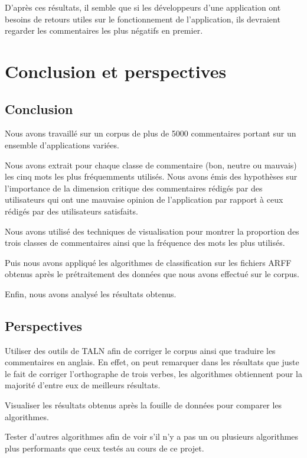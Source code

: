 \documentclass[a4paper, 11pt]{article}
\begin{document}
D'après ces résultats, il semble que si les développeurs d'une application ont besoins de retours utiles sur le fonctionnement de l'application, ils devraient regarder les commentaires les plus négatifs en premier.

\section{Conclusion et perspectives}
\subsection{Conclusion}
Nous avons travaillé sur un corpus de plus de 5000 commentaires portant sur un ensemble d'applications variées. 

Nous avons extrait pour chaque classe de commentaire (bon, neutre ou mauvais) les cinq mots les plus fréquemments utilisés. Nous avons émis des hypothèses sur l'importance de la dimension critique des commentaires rédigés par des utilisateurs qui ont une mauvaise opinion de l'application par rapport à ceux rédigés par des utilisateurs satisfaits.

Nous avons utilisé des techniques de visualisation pour montrer la proportion des trois classes de commentaires ainsi que la fréquence des mots les plus utilisés.

Puis nous avons appliqué les algorithmes de classification sur les fichiers ARFF obtenus après le prétraitement des données que nous avons effectué sur le corpus.

Enfin, nous avons analysé les résultats obtenus.

\subsection{Perspectives}
Utiliser des outils de TALN afin de corriger le corpus ainsi que traduire les commentaires en anglais. En effet, on peut remarquer dans les résultats que juste le fait de corriger l'orthographe de trois verbes, les algorithmes obtiennent pour la majorité d'entre eux de meilleurs résultats.

Visualiser les résultats obtenus après la fouille de données pour comparer les algorithmes.

Tester d'autres algorithmes afin de voir s'il n'y a pas un ou plusieurs algorithmes plus performants que ceux testés au cours de ce projet.
\end{document}
